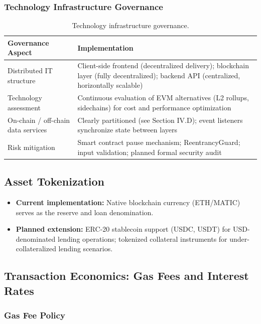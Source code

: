 \documentclass[11pt,a4paper]{article}
\newcommand{\tableheadfont}{\bfseries\small\color{PrimaryBlue}}
\newenvironment{moderntable}[1][H]{%
    \begin{table}[#1]\centering\small%
    \renewcommand{\arraystretch}{1.35}%
}{%
    \end{table}%
}
\begin{document}
\subsubsection{Technology Infrastructure Governance}

\begin{moderntable}
\caption{Technology infrastructure governance.}
\begin{tabular}{@{} >{\raggedright}p{3.5cm} >{\raggedright\arraybackslash}p{8.5cm} @{}}
\toprule
\tableheadfont Governance Aspect & \tableheadfont Implementation \\
\midrule
\rowcolor{RowShade}
Distributed IT structure & Client-side frontend (decentralized delivery); blockchain layer (fully decentralized); backend API (centralized, horizontally scalable) \\
Technology assessment & Continuous evaluation of EVM alternatives (L2 rollups, sidechains) for cost and performance optimization \\
\rowcolor{RowShade}
On-chain / off-chain data services & Clearly partitioned (see Section IV.D); event listeners synchronize state between layers \\
Risk mitigation & Smart contract pause mechanism; ReentrancyGuard; input validation; planned formal security audit \\
\bottomrule
\end{tabular}
\end{moderntable}

\subsection{Asset Tokenization}

\begin{itemize}[noitemsep]
\item \textbf{Current implementation:} Native blockchain currency (ETH/MATIC) serves as the reserve and loan denomination.
\item \textbf{Planned extension:} ERC-20 stablecoin support (USDC, USDT) for USD-denominated lending operations; tokenized collateral instruments for under-collateralized lending scenarios.
\end{itemize}

\subsection{Transaction Economics: Gas Fees and Interest Rates}

\subsubsection{Gas Fee Policy}
\end{document}
